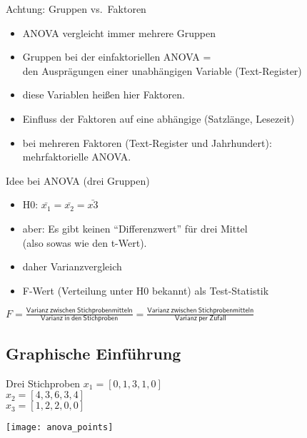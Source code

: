 \begin{frame}
  {Achtung: Gruppen vs.\ Faktoren}
  \begin{itemize}[<+->]
    \item ANOVA vergleicht immer \alert{mehrere Gruppen}
    \item Gruppen bei der einfaktoriellen ANOVA =\\
      den Ausprägungen \alert{einer unabhängigen Variable} (\zB Text-Register)
    \item diese Variablen heißen hier \alert{Faktoren}.
      \Zeile
    \item Einfluss der Faktoren auf \alert{eine abhängige} (\zB Satzlänge, Lesezeit)
      \Zeile
    \item bei mehreren Faktoren (\zB Text-Register und Jahrhundert):\\
      \alert{mehrfaktorielle ANOVA}.
  \end{itemize}
\end{frame}

\begin{frame}
  {Idee bei ANOVA (\zB drei Gruppen)}
  \begin{itemize}[<+->]
    \item \alert{H0: $\bar{x_1}=\bar{x_2}=\bar{x3}$}
    \item aber: \alert{Es gibt keinen ``Differenzwert'' für drei Mittel}\\
      (also sowas wie den t-Wert).
      \Zeile
    \item daher \alert{Varianzvergleich}
    \item \alert{F-Wert} (Verteilung unter H0 bekannt) als Test-Statistik
  \end{itemize}
  \pause
  \vspace{0.5cm}
  \begin{center}
    \alert{$F=\frac{\mathsf{Varianz\ zwischen\ Stichprobenmitteln}}{\mathsf{Varianz\ in\ den\ Stichproben}}=\frac{\mathsf{Varianz\ zwischen\ Stichprobenmitteln}}{\mathsf{Varianz\ per\ Zufall}}$}
  \end{center}
\end{frame}


\subsection{Graphische Einführung}

\begin{frame}
  {Drei Stichproben}
  $x_1=[0, 1, 3, 1, 0]$\\
  $x_2=[4, 3, 6, 3, 4]$\\
  $x_3=[1, 2, 2, 0, 0]$\\

  \vspace{-0.5cm}
  \begin{center}
    \texttt{[image: anova\_points]}
  \end{center}
\end{frame}


